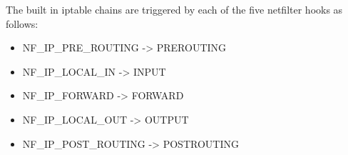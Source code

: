 The built in iptable chains are triggered by each of the five netfilter hooks as
follows:

\begin{itemize}
	\item NF\_IP\_PRE\_ROUTING -> PREROUTING
	\item NF\_IP\_LOCAL\_IN -> INPUT
	\item NF\_IP\_FORWARD -> FORWARD
	\item NF\_IP\_LOCAL\_OUT -> OUTPUT
	\item NF\_IP\_POST\_ROUTING -> POSTROUTING
\end{itemize}

